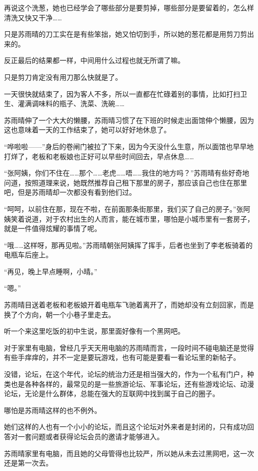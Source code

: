 再说这个洗葱，她也已经学会了哪些部分是要剪掉，哪些部分是要留着的，怎么样清洗又快又干净……

只是苏雨晴的刀工实在是有些笨拙，她又怕切到手，所以她的葱花都是用剪刀剪出来的。

反正最后的结果都一样，中间用什么过程也就无所谓了嘛。

只是剪刀肯定没有用刀那么快就是了。

一天很快就结束了，因为客人不多，所以一直都在忙碌着别的事情，比如打扫卫生、灌满调味料的瓶子、洗菜、洗碗……

苏雨晴伸了一个大大的懒腰，苏雨晴习惯了在下班的时候走出面馆伸个懒腰，因为这也意味着一天的工作结束了，她可以好好地休息了。

“哗啦啦——”身后的卷闸门被拉了下来，因为今天没什么生意，所以面馆也早早地打烊了，老板和老板娘也正好可以早些时间回去，早点休息……

“张阿姨，你们不住在……那个……老虎……唔……我住的地方吗？”苏雨晴有些好奇地问道，按照道理来说，她既然推荐自己租下那里的房子，那应该自己也住在那里吧，但是苏雨晴却一次都没有看到他们过。

“呵呵，以前住在那，现在不啦，在前面那条街那里，我们买了自己的房子。”张阿姨笑着说道，对于农村出生的人而言，能在城市里，哪怕是小城市里有一套房子，就是一件值得炫耀的事情了呢。

“哦……这样呀，那再见啦。”苏雨晴朝张阿姨挥了挥手，后者也坐到了李老板骑着的电瓶车后座上。

“再见，晚上早点睡啊，小晴。”

“嗯。”

苏雨晴目送着老板和老板娘开着电瓶车飞驰着离开了，而她却没有立刻回家，而是换了个方向，朝一个小巷子里走去。

听一个来这里吃饭的初中生说，那里面好像有一个黑网吧。

对于家里有电脑，曾经几乎天天用电脑的苏雨晴而言，一段时间不碰电脑还是觉得有些手痒痒的，并不一定是要玩游戏，也有可能是要看一看论坛里的新帖子。

没错，论坛，在这个年代，论坛的统治力还是相当强大的，作为一个私有门户，种类也是各种各样的，最常见的是一些旅游论坛、军事论坛，还有些游戏论坛、动漫论坛，无论是什么群体，总能在强大的互联网中找到属于自己的圈子。

哪怕是苏雨晴这样的也不例外。

她们这样的人也有一个小小的论坛，而且这个论坛对外来者是封闭的，只有成功回答对一套问题或者获得论坛会员的邀请才能够进入。

苏雨晴家里有电脑，而且她的父母管得也比较严，所以她从未去过黑网吧，这一次还是第一次去。

